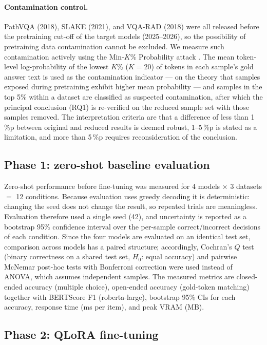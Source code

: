 \paragraph{Contamination control.}
PathVQA (2018), SLAKE (2021), and VQA-RAD (2018) were all released before the
pretraining cut-off of the target models (2025--2026), so the possibility of
pretraining data contamination cannot be excluded. We measure such contamination
actively using the Min-$K$\% Probability attack \citep{shi2024minkprob}. The mean
token-level log-probability of the lowest $K$\% ($K = 20$) of tokens in each
sample's gold answer text is used as the contamination indicator --- on the
theory that samples exposed during pretraining exhibit higher mean probability
--- and samples in the top 5\% within a dataset are classified as suspected
contamination, after which the principal conclusion (RQ1) is re-verified on the
reduced sample set with those samples removed. The interpretation criteria are
that a difference of less than 1\,\%p between original and reduced results is
deemed robust, 1--5\,\%p is stated as a limitation, and more than 5\,\%p requires
reconsideration of the conclusion.

\subsection{Phase 1: zero-shot baseline evaluation}
\label{sec:phase1}

Zero-shot performance before fine-tuning was measured for $4$ models $\times$ $3$
datasets $=$ 12 conditions. Because evaluation uses greedy decoding it is
deterministic: changing the seed does not change the result, so repeated trials
are meaningless. Evaluation therefore used a single seed (42), and uncertainty is
reported as a bootstrap 95\% confidence interval over the per-sample
correct/incorrect decisions of each condition. Since the four models are
evaluated on an identical test set, comparison across models has a paired
structure; accordingly, Cochran's $Q$ test (binary correctness on a shared test
set, $H_0$: equal accuracy) and pairwise McNemar post-hoc tests with Bonferroni
correction were used instead of ANOVA, which assumes independent samples. The
measured metrics are closed-ended accuracy (multiple choice), open-ended accuracy
(gold-token matching) together with BERTScore F1 (roberta-large), bootstrap 95\%
CIs for each accuracy, response time (ms per item), and peak VRAM (MB).

\subsection{Phase 2: QLoRA fine-tuning}
\label{sec:phase2}

